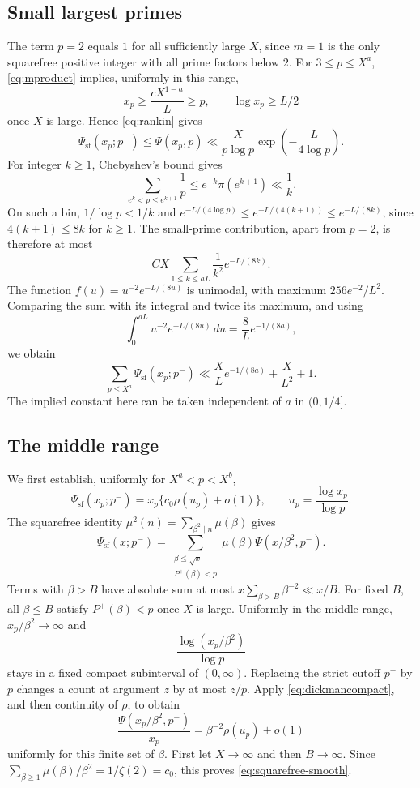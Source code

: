 \subsection{Small largest primes}
The term $p=2$ equals $1$ for all sufficiently large $X$, since $m=1$
is the only squarefree positive integer with all prime factors below $2$.
For $3\le p\le X^a$, \eqref{eq:mproduct} implies, uniformly in this range,
\[
 x_p\ge \frac{cX^{1-a}}{L}\ge p,\qquad \log x_p\ge L/2
\]
once $X$ is large. Hence \eqref{eq:rankin} gives
\[
 \Psi_{\mathrm{sf}}(x_p;p^-)
 \le\Psi(x_p,p)
 \ll\frac{X}{p\log p}\exp\left(-\frac{L}{4\log p}\right).
\]
For integer $k\ge1$, Chebyshev's bound gives
\[
 \sum_{e^k<p\le e^{k+1}}\frac1p
 \le e^{-k}\pi(e^{k+1})\ll\frac1k.
\]
On such a bin, $1/\log p<1/k$ and
$e^{-L/(4\log p)}\le e^{-L/(4(k+1))}\le e^{-L/(8k)}$, since $4(k+1)\le8k$
for $k\ge1$. The small-prime contribution, apart from $p=2$, is therefore
at most
\[
 CX\sum_{1\le k\le aL}\frac1{k^2}e^{-L/(8k)}.
\]
The function $f(u)=u^{-2}e^{-L/(8u)}$ is unimodal, with maximum
$256e^{-2}/L^2$. Comparing the sum with its integral and twice its maximum,
and using
\[
 \int_0^{aL}u^{-2}e^{-L/(8u)}\,du
 =\frac8L e^{-1/(8a)},
\]
we obtain
\begin{equation}\label{eq:smallrange}
 \sum_{p\le X^a}\Psi_{\mathrm{sf}}(x_p;p^-)
 \ll \frac XL e^{-1/(8a)}+\frac X{L^2}+1.
\end{equation}
The implied constant here can be taken independent of $a$ in $(0,1/4]$.

\subsection{The middle range}
We first establish, uniformly for $X^a<p<X^b$,
\begin{equation}\label{eq:squarefree-smooth}
 \Psi_{\mathrm{sf}}(x_p;p^-)
 =x_p\{c_0\rho(u_p)+o(1)\},
 \qquad u_p=\frac{\log x_p}{\log p}.
\end{equation}
The squarefree identity $\mu^2(n)=\sum_{\beta^2\mid n}\mu(\beta)$ gives
\[
 \Psi_{\mathrm{sf}}(x;p^-)
 =\sum_{\substack{\beta\le\sqrt x\\P^+(\beta)<p}}
   \mu(\beta)\Psi(x/\beta^2,p^-).
\]
Terms with $\beta>B$ have absolute sum at most
$x\sum_{\beta>B}\beta^{-2}\ll x/B$. For fixed $B$, all $\beta\le B$
satisfy $P^+(\beta)<p$ once $X$ is large. Uniformly in the middle range,
$x_p/\beta^2\to\infty$ and
\[
 \frac{\log(x_p/\beta^2)}{\log p}
\]
stays in a fixed compact subinterval of $(0,\infty)$.
Replacing the strict cutoff $p^-$ by $p$ changes a count at argument $z$
by at most $z/p$. Apply \eqref{eq:dickmancompact}, and then continuity
of $\rho$, to obtain
\[
 \frac{\Psi(x_p/\beta^2,p^-)}{x_p}
 =\beta^{-2}\rho(u_p)+o(1)
\]
uniformly for this finite set of $\beta$. First let $X\to\infty$ and then
$B\to\infty$. Since $\sum_{\beta\ge1}\mu(\beta)/\beta^2=1/\zeta(2)=c_0$,
this proves \eqref{eq:squarefree-smooth}.

